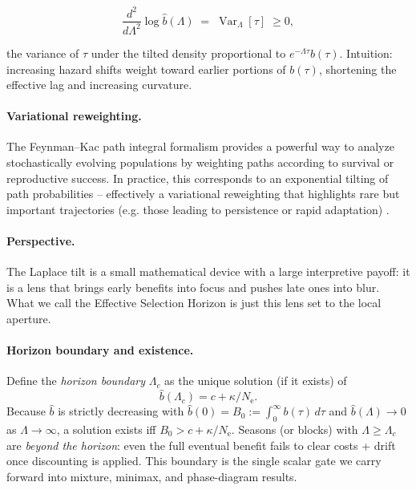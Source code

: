 \documentclass[11pt]{article}
\theoremstyle{upright}
\newcommand{\Ne}{N_{\mathrm{e}}}
\begin{document}
$$
\frac{d^2}{d\Lambda^2}\log \widehat b(\Lambda)\;=\;\operatorname{Var}_\Lambda[\tau]\;\ge 0,
$$

the variance of $\tau$ under the tilted density proportional to $e^{-\Lambda \tau} b(\tau)$. Intuition: increasing hazard shifts weight toward earlier portions of $b(\tau)$, shortening the effective lag and increasing curvature.

\paragraph{Variational reweighting.}
The Feynman--Kac path integral formalism provides a powerful way to analyze stochastically evolving populations by weighting paths according to survival or reproductive success. In practice, this corresponds to an exponential tilting of path probabilities – effectively a variational reweighting that highlights rare but important trajectories (e.g. those leading to persistence or rapid adaptation) \citep{Mustonen2010}.

\paragraph{Perspective.}
The Laplace tilt is a small mathematical device with a large interpretive payoff:
it is a lens that brings early benefits into focus and pushes late ones into blur.
What we call the Effective Selection Horizon is just this lens set to the local aperture.

\paragraph{Horizon boundary and existence.}
Define the \emph{horizon boundary} $\Lambda_c$ as the unique solution (if it exists) of
\begin{equation}
\label{eq:horizon-boundary}
\widehat b(\Lambda_c)=c+\kappa/\Ne.
\end{equation}
Because $\widehat b$ is strictly decreasing with $\widehat b(0)=B_0:=\int_0^\infty b(\tau)\,d\tau$ and $\widehat b(\Lambda)\to 0$ as $\Lambda\to\infty$, a solution exists iff $B_0>c+\kappa/\Ne$. Seasons (or blocks) with $\Lambda\ge \Lambda_c$ are \emph{beyond the horizon}: even the full eventual benefit fails to clear costs + drift once discounting is applied. This boundary is the single scalar gate we carry forward into mixture, minimax, and phase-diagram results.
\end{document}
